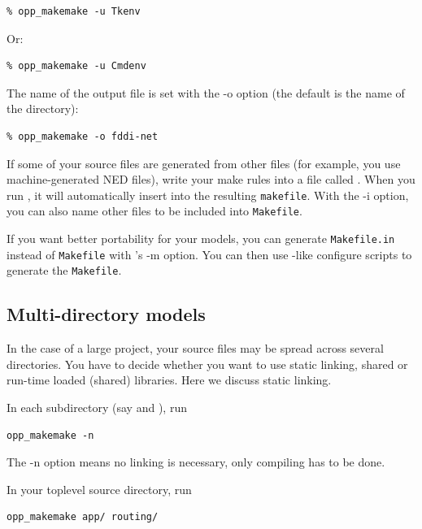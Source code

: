 \begin{verbatim}
% opp_makemake -u Tkenv
\end{verbatim}

Or:

\begin{verbatim}
% opp_makemake -u Cmdenv
\end{verbatim}

The name of the output file is set with the -o
option (the default is the name of the directory):

\begin{verbatim}
% opp_makemake -o fddi-net
\end{verbatim}

If some of your source files are generated from other files (for
example, you use machine-generated NED files), write your make rules
into a file called . When you run , it
will automatically insert  into the resulting \texttt{makefile}.
With the -i option, you can also name other files to be included into
\texttt{Makefile}.


If you want better portability for your models, you can generate
\texttt{Makefile.in} instead of \texttt{Makefile} with 's
-m option. You can then use -like configure scripts to generate
the \texttt{Makefile}.




\subsection{Multi-directory models}

In the case of a large project, your source files may be spread across
several directories. You have to decide whether you want to use static
linking, shared or run-time loaded (shared)
libraries. Here we discuss static linking.


In each subdirectory (say  and ), run

\begin{verbatim}
opp_makemake -n
\end{verbatim}

The -n option means no linking is necessary, only compiling has
to be done.

In your toplevel source directory, run

\begin{verbatim}
opp_makemake app/ routing/
\end{verbatim}

